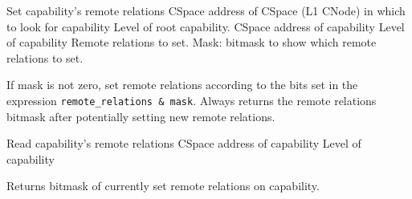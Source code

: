 
\begin{invocation}{Set capability's remote relations}
  \arg CSpace address of CSpace (L1 CNode) in which to look for capability
  \arg Level of root capability.
  \arg CSpace address of capability
  \arg Level of capability
  \arg Remote relations to set.
  \arg Mask: bitmask to show which remote relations to set.
\end{invocation}
If mask is not zero, set remote relations according to the bits set in the
expression \verb|remote_relations & mask|.
Always returns the remote relations bitmask after potentially setting new
remote relations.

\begin{invocation}{Read capability's remote relations}
  \arg CSpace address of capability
  \arg Level of capability
\end{invocation}
Returns bitmask of currently set remote relations on capability.

